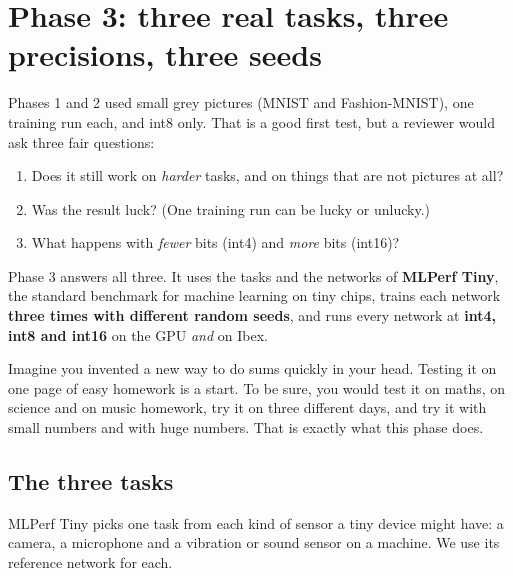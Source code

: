 \section{Phase 3: three real tasks, three precisions, three seeds}\label{sec:tiny}

Phases 1 and 2 used small grey pictures (MNIST and Fashion-MNIST), one training run each, and int8 only. That
is a good first test, but a reviewer would ask three fair questions:

\begin{enumerate}
  \item Does it still work on \emph{harder} tasks, and on things that are not pictures at all?
  \item Was the result luck? (One training run can be lucky or unlucky.)
  \item What happens with \emph{fewer} bits (int4) and \emph{more} bits (int16)?
\end{enumerate}

Phase 3 answers all three. It uses the tasks and the networks of \textbf{MLPerf Tiny}, the standard benchmark
for machine learning on tiny chips, trains each network \textbf{three times with different random seeds}, and
runs every network at \textbf{int4, int8 and int16} on the GPU \emph{and} on Ibex.

\begin{kid}
Imagine you invented a new way to do sums quickly in your head. Testing it on one page of easy homework is a
start. To be sure, you would test it on maths, on science and on music homework, try it on three different
days, and try it with small numbers and with huge numbers. That is exactly what this phase does.
\end{kid}

\subsection{The three tasks}

MLPerf Tiny picks one task from each kind of sensor a tiny device might have: a camera, a microphone and a
vibration or sound sensor on a machine. We use its reference network for each.

